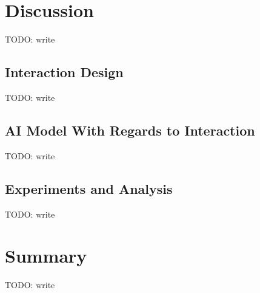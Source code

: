 \documentclass[final,5p,times,twocolumn,authoryear]{article}
\begin{document}
\section{Discussion}

TODO: write

\subsection{Interaction Design}

TODO: write

\subsection{AI Model With Regards to Interaction}

TODO: write

\subsection{Experiments and Analysis}

TODO: write

\section{Summary}

TODO: write

 

\end{document}
